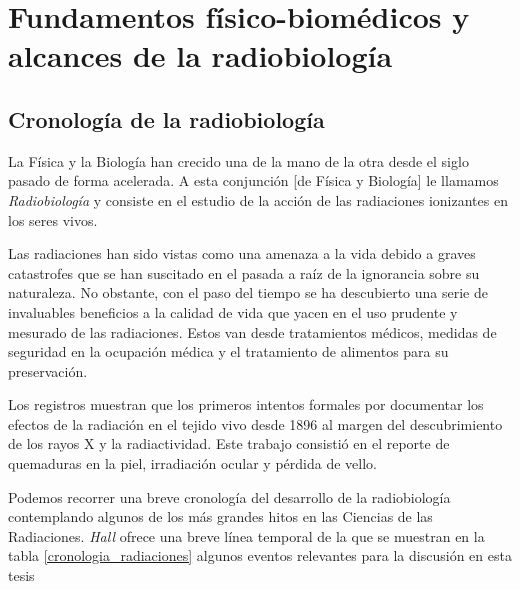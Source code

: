 \documentclass[12pt,letterpaper, oneside]{book}
\begin{document}
	\chapter{Fundamentos físico-biomédicos y alcances de la radiobiología}\label{fundamentos_fisico_biomedicos}
		\section{Cronología de la radiobiología} %
		La Física y la Biología han crecido una de la mano de la otra desde el siglo pasado de forma acelerada. A esta conjunción [de Física y Biología] le llamamos \textit{Radiobiología} y consiste en el estudio de la acción de las radiaciones ionizantes en los seres vivos\cite{Hall.2000}. 
		
		Las radiaciones han sido vistas como una amenaza a la vida debido a graves catastrofes que se han suscitado en el pasada a raíz de la ignorancia sobre su naturaleza\cite{Prasad.1995}. No obstante, con el paso del tiempo se ha descubierto una serie de invaluables beneficios a la calidad de vida que yacen en el uso prudente y mesurado de las radiaciones. Estos van desde tratamientos médicos, medidas de seguridad en la ocupación médica y el tratamiento de alimentos para su preservación\cite{Prasad.1995}. 
		
		Los registros muestran que los primeros intentos formales por documentar los efectos de la radiación en el tejido vivo desde 1896 al margen del descubrimiento de los rayos X y la radiactividad\cite{Hall.2000}. Este trabajo consistió en el reporte de quemaduras en la piel, irradiación ocular y pérdida de vello. 
		
		Podemos recorrer una breve cronología del desarrollo de la radiobiología contemplando algunos de los más grandes hitos en las Ciencias de las Radiaciones. \textit{Hall} ofrece una breve línea temporal de la que se muestran en la tabla \ref{cronologia_radiaciones} algunos eventos relevantes para la discusión en esta tesis
		
\end{document}
